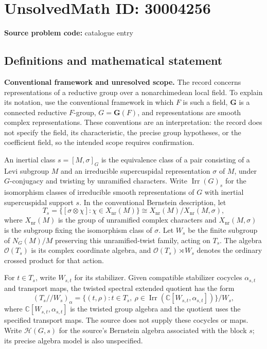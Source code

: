 \documentclass[11pt]{article}
\newcommand{\C}{\mathbb{C}}
\begin{document}
\section*{UnsolvedMath ID: 30004256}
\textbf{Source problem code:} catalogue entry
\subsection{Definitions and mathematical statement}
\textbf{Conventional framework and unresolved scope.} The record concerns representations of a reductive group over a nonarchimedean local field. To explain its notation, use the conventional framework in which \(F\) is such a field, \(\mathbf G\) is a connected reductive \(F\)-group, \(G=\mathbf G(F)\), and representations are smooth complex representations. These conventions are an interpretation: the record does not specify the field, its characteristic, the precise group hypotheses, or the coefficient field, so the intended scope requires confirmation.

An inertial class \(s=[M,\sigma]_G\) is the equivalence class of a pair consisting of a Levi subgroup \(M\) and an irreducible supercuspidal representation \(\sigma\) of \(M\), under \(G\)-conjugacy and twisting by unramified characters. Write \(\operatorname{Irr}(G)_s\) for the isomorphism classes of irreducible smooth representations of \(G\) with inertial supercuspidal support \(s\). In the conventional Bernstein description, let
\[
T_s=\{[\sigma\otimes\chi]:\chi\in X_{\mathrm{nr}}(M)\}
\cong X_{\mathrm{nr}}(M)/X_{\mathrm{nr}}(M,\sigma),
\]
where \(X_{\mathrm{nr}}(M)\) is the group of unramified complex characters and \(X_{\mathrm{nr}}(M,\sigma)\) is the subgroup fixing the isomorphism class of \(\sigma\). Let \(W_s\) be the finite subgroup of \(N_G(M)/M\) preserving this unramified-twist family, acting on \(T_s\). The algebra \(\mathcal O(T_s)\) is its complex coordinate algebra, and \(\mathcal O(T_s)\rtimes W_s\) denotes the ordinary crossed product for that action.

For \(t\in T_s\), write \(W_{s,t}\) for its stabilizer. Given compatible stabilizer cocycles \(\alpha_{s,t}\) and transport maps, the twisted spectral extended quotient has the form
\[
(T_s/\!/W_s)_\alpha
=
\bigl\{(t,\rho):t\in T_s,\ \rho\in\operatorname{Irr}(\C[W_{s,t},\alpha_{s,t}])\bigr\}/W_s,
\]
where \(\C[W_{s,t},\alpha_{s,t}]\) is the twisted group algebra and the quotient uses the specified transport maps. The source does not supply these cocycles or maps. Write \(\mathcal H(G,s)\) for the source's Bernstein algebra associated with the block \(s\); its precise algebra model is also unspecified.
\end{document}
